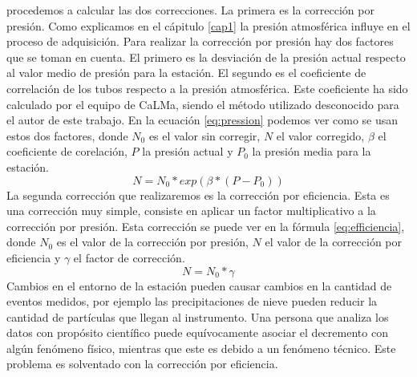             procedemos a calcular las dos correcciones. La primera es la
            corrección por presión. Como explicamos en el cápitulo \ref{cap1}
            la presión atmosférica influye en el proceso de adquisición. Para
            realizar la corrección por presión hay dos factores que se toman en
            cuenta. El primero es la desviación de la presión actual respecto
            al valor medio de presión para la estación. El segundo es el
            coeficiente de correlación de los tubos respecto a la presión
            atmosférica. Este coeficiente ha sido calculado por el equipo de
            CaLMa, siendo el método utilizado desconocido para el autor de este
            trabajo. En la ecuación \ref{eq:pression} podemos ver como se usan
            estos dos factores, donde $N_0$ es el valor sin corregir, $N$ el
            valor corregido, $\beta$ el coeficiente de corelación, $P$ la
            presión actual y $P_0$ la presión media para la estación.
            \begin{equation}\label{eq:pression}
              N=N_0*exp(\beta*(P-P_0))
            \end{equation}
            La segunda corrección que realizaremos es la corrección por
            eficiencia. Esta es una corrección muy simple, consiste en aplicar
            un factor multiplicativo a la corrección por presión. Esta
            corrección se puede ver en la fórmula \ref{eq:efficiencia}, donde
            $N_0$ es el valor de la corrección por presión, $N$ el valor de la
            corrección por eficiencia y $\gamma$ el factor de corrección. 
            \begin{equation}\label{eq:efficiencia}
              N=N_0*\gamma
            \end{equation}
            Cambios en el entorno de la estación pueden causar cambios en la
            cantidad de eventos medidos, por ejemplo las precipitaciones de
            nieve pueden reducir la cantidad de partículas que llegan al
            instrumento. Una persona que analiza los datos con propósito
            científico puede equívocamente asociar el decremento con algún
            fenómeno físico, mientras que este es debido a un fenómeno técnico.
            Este problema es solventado con la corrección por eficiencia.   
